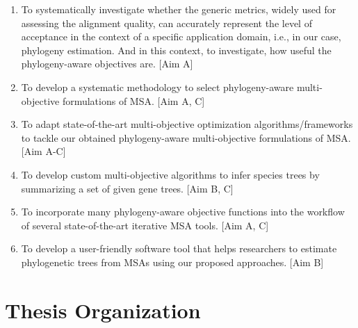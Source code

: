 \begin{enumerate}
\item To systematically investigate whether the generic metrics, widely used for assessing the alignment quality, can accurately represent the level of acceptance in the context of a specific application domain, i.e., in our case, phylogeny estimation. And in this context, to investigate, how useful the phylogeny-aware objectives are. [Aim A]

\item To develop a systematic methodology to select phylogeny-aware multi-objective formulations of MSA. [Aim A, C]

\item To adapt state-of-the-art multi-objective optimization algorithms/frameworks to tackle our obtained phylogeny-aware multi-objective formulations of MSA. [Aim A-C]

\item To develop custom multi-objective algorithms to infer species trees by summarizing a set of given gene trees. [Aim B, C]

\item To incorporate many phylogeny-aware objective functions into the workflow of several state-of-the-art iterative MSA tools. [Aim A, C]

\item To develop a user-friendly software tool that helps researchers to estimate phylogenetic trees from MSAs using our proposed approaches. [Aim B]
\end{enumerate}

\begin{comment}

By accomplishing our objectives mentioned above we expect to obtain the following outcomes.

(i) A systematic methodology for choosing an appropriate multi-objective formulation of MSA considering the application domain (i.e., in our case phylogeny estimation). [Aim A, C]

(ii) Several phylogeny-aware multi-objective formulations of MSA. [Aim A, C]

(iii) Some robust methods for alignment-based phylogeny estimation stemming from the hybridization of state-of-the-art iterative MSA methods and many-objective optimization strategies. [Aim A-C]

(iv) Some customized multi-objective optimization algorithms for species tree estimation by summarizing a set of given gene trees. [Aim B, C]

(v) As a by-product of the above outcome, new MO frameworks may be proposed that could be of independent interest. [Aim C]

(vi) Open-source software tools for estimating phylogenetic trees from MSAs using our proposed approaches. [Aim B]

(vii) A scientific discourse along with a comparative analysis on the overall efficacy of the concept of domain-specific measures in general and phylogeny-awareness in particular. [Aim A]
\end{comment}

\section{Thesis Organization}
